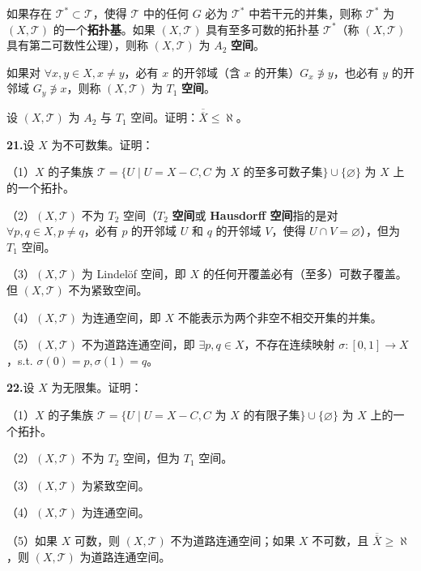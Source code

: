 \documentclass[11pt,a4paper]{article}
\begin{document}
\par\noindent 如果存在 $\mathcal T^*\subset\mathcal T$，使得 $\mathcal T$ 中的任何 $G$ 必为 $\mathcal T^*$ 中若干元的并集，则称 $\mathcal T^*$ 为 $(X,\mathcal T)$ 的一个\textbf{拓扑基}。如果 $(X,\mathcal T)$ 具有至多可数的拓扑基 $\mathcal T^*$（称 $(X,\mathcal T)$ 具有第二可数性公理），则称 $(X,\mathcal T)$ 为 $A_2$ \textbf{空间}。
\par\noindent 如果对 $\forall x,y\in X,x\ne y$，必有 $x$ 的开邻域（含 $x$ 的开集）$G_x\not\ni y$，也必有 $y$ 的开邻域 $G_y\not\ni x$，则称 $(X,\mathcal T)$ 为 $T_1$ \textbf{空间}。
\par\noindent 设 $(X,\mathcal T)$ 为 $A_2$ 与 $T_1$ 空间。证明：$\overline{\overline X}\leq\aleph$。
\par{}\noindent\hypertarget{review-q21}{}\textbf{21.}\quad 设 $X$ 为不可数集。证明：
\par\noindent （1）$X$ 的子集族 $\mathcal T=\{U\mid U=X-C,C\text{ 为 }X\text{ 的至多可数子集}\}\cup\{\varnothing\}$ 为 $X$ 上的一个拓扑。
\par\noindent （2）$(X,\mathcal T)$ 不为 $T_2$ 空间（$T_2$ \textbf{空间}或 \textbf{Hausdorff 空间}指的是对 $\forall p,q\in X,p\ne q$，必有 $p$ 的开邻域 $U$ 和 $q$ 的开邻域 $V$，使得 $U\cap V=\varnothing$），但为 $T_1$ 空间。
\par\noindent （3）$(X,\mathcal T)$ 为 Lindelöf 空间，即 $X$ 的任何开覆盖必有（至多）可数子覆盖。但 $(X,\mathcal T)$ 不为紧致空间。
\par\noindent （4）$(X,\mathcal T)$ 为连通空间，即 $X$ 不能表示为两个非空不相交开集的并集。
\par\noindent （5）$(X,\mathcal T)$ 不为道路连通空间，即 $\exists p,q\in X$，不存在连续映射 $\sigma:[0,1]\to X$，s.t. $\sigma(0)=p,\sigma(1)=q$。
\par{}\noindent\hypertarget{review-q22}{}\textbf{22.}\quad 设 $X$ 为无限集。证明：
\par\noindent （1）$X$ 的子集族 $\mathcal T=\{U\mid U=X-C,C\text{ 为 }X\text{ 的有限子集}\}\cup\{\varnothing\}$ 为 $X$ 上的一个拓扑。
\par\noindent （2）$(X,\mathcal T)$ 不为 $T_2$ 空间，但为 $T_1$ 空间。
\par\noindent （3）$(X,\mathcal T)$ 为紧致空间。
\par\noindent （4）$(X,\mathcal T)$ 为连通空间。
\par\noindent （5）如果 $X$ 可数，则 $(X,\mathcal T)$ 不为道路连通空间；如果 $X$ 不可数，且 $\overline{\overline X}\geq\aleph$，则 $(X,\mathcal T)$ 为道路连通空间。
\end{document}
